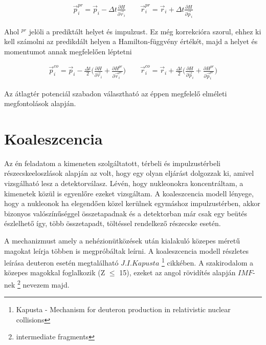 \documentclass[a4paper,12pt]{article}
\begin{document}
\begin{gather}
	\vec{p}^{pr}_{i} = \vec{p}_{i} - \Delta t \frac{\partial H}{\partial \vec{r}_{i}} \quad \quad \vec{r}^{pr}_{i} = \vec{r}_{i} + \Delta t \frac{\partial H}{\partial \vec{p}_{i}}
\end{gather}

\par Ahol $^{pr}$ jelöli a prediktált helyet és impulzust. Ez még korrekcióra szorul, ehhez ki kell számolni az predikdált helyen a Hamilton-függvény értékét, majd a helyet és momentumot annak megfelelően léptetni

\begin{gather}
	\vec{p}^{co}_{i} = \vec{p}_{i} - \frac{\Delta t}{2} \Big(\frac{\partial H}{\partial \vec{r}_{i}} + \frac{\partial H^{pr}}{\partial \vec{r}_{i}^{pr}} \Big) \quad \quad \vec{r}^{co}_{i} = \vec{r}_{i} + \frac{\Delta t}{2} \Big( \frac{\partial H}{\partial \vec{p}_{i}} + \frac{\partial H^{pr}}{\partial \vec{p}_{i}^{pr}} \Big)
\end{gather}

\par Az átlagtér potenciál szabadon választható az éppen megfelelő elméleti megfontolások alapján.

\section{ Koaleszcencia}

\par Az én feladatom a kimeneten szolgáltatott, térbeli és impulzustérbeli részecskeeloszlások alapján az volt, hogy egy olyan eljárást dolgozzak ki, amivel vizsgálható lesz a detektorválasz. Lévén, hogy nukleonokra koncentráltam, a kimenetek közül is egyenlőre ezeket vizsgáltam. A koaleszcencia modell lényege, hogy a nukleonok ha elegendően közel kerülnek egymáshoz impulzustérben, akkor bizonyos valószínűséggel összetapadnak és a detektorban már csak egy beütés észlelhető így, több összetapadt, töltéssel rendelkező részecske esetén.

\par A mechanizmust amely a nehézionütközések után kialakuló közepes méretű magokat leírja többen is megpróbáltak leírni. A koaleszcencia modell részletes leírása deuteron esetén megtalálható $J. I. Kapusta$ \footnote{Kapusta - Mechanism for deuteron production in relativistic nuclear collisions} cikkében. A szakirodalom a közepes magokkal foglalkozik (Z $\leq$ 15), ezeket az angol rövidítés alapján $IMF$-nek \footnote{intermediate fragments} nevezem majd. 
\end{document}
